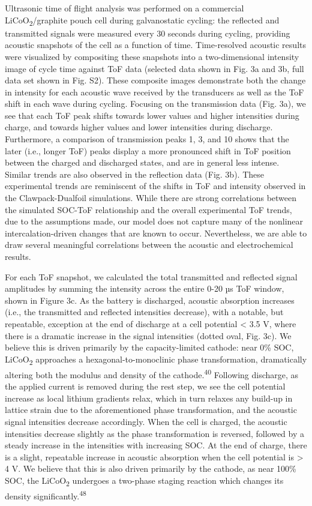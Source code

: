 \documentclass[]{article}
\begin{document}
{ }Ultrasonic time of flight analysis was performed on a commercial
LiCoO\textsubscript{2}/graphite pouch cell during galvanostatic cycling:
the reflected and transmitted signals were measured every 30 seconds
during cycling, providing acoustic snapshots of the cell as a function
of time. Time-resolved acoustic results were visualized by compositing
these snapshots into a two-dimensional intensity image of cycle time
against ToF data (selected data shown in Fig. 3a and 3b, full data set
shown in Fig. S2). These composite images demonstrate both the change in
intensity for each acoustic wave received by the transducers as well as
the ToF shift in each wave during cycling. Focusing on the transmission
data (Fig. 3a), we see that each ToF peak shifts towards lower values
and higher intensities during charge, and towards higher values and
lower intensities during discharge. Furthermore, a comparison of
transmission peaks 1, 3, and 10 shows that the later (i.e., longer ToF)
peaks display a more pronounced shift in ToF position between the
charged and discharged states, and are in general less intense. Similar
trends are also observed in the reflection data (Fig. 3b). These
experimental trends are reminiscent of the shifts in ToF and intensity
observed in the Clawpack-Dualfoil simulations. While there are strong
correlations between the simulated SOC-ToF relationship and the overall
experimental ToF trends, due to the assumptions made, our model does not
capture many of the nonlinear intercalation-driven changes that are
known to occur. Nevertheless, we are able to draw several meaningful
correlations between the acoustic and electrochemical results.

{ }For each ToF snapshot, we calculated the total transmitted and
reflected signal amplitudes by summing the intensity across the entire
0-20 µs ToF window, shown in Figure 3c. As the battery is discharged,
acoustic absorption increases (i.e., the transmitted and reflected
intensities decrease), with a notable, but repeatable, exception at the
end of discharge at a cell potential \textless{} 3.5 V, where there is a
dramatic increase in the signal intensities (dotted oval, Fig. 3c). We
believe this is driven primarily by the capacity-limited cathode: near
0\% SOC, LiCoO\textsubscript{2} approaches a hexagonal-to-monoclinic
phase transformation, dramatically altering both the modulus and density
of the cathode.\textsuperscript{40} Following discharge, as the applied
current is removed during the rest step, we see the cell potential
increase as local lithium gradients relax, which in turn relaxes any
build-up in lattice strain due to the aforementioned phase
transformation, and the acoustic signal intensities decrease
accordingly. When the cell is charged, the acoustic intensities decrease
slightly as the phase transformation is reversed, followed by a steady
increase in the intensities with increasing SOC. At the end of charge,
there is a slight, repeatable increase in acoustic absorption when the
cell potential is \textgreater{} 4 V. We believe that this is also
driven primarily by the cathode, as near 100\% SOC, the
LiCoO\textsubscript{2} undergoes a two-phase staging reaction which
changes its density significantly.\textsuperscript{48}{~}
\end{document}
